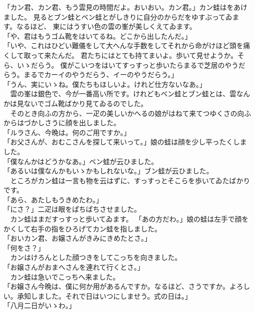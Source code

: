 \documentclass[
a4paper,
book]
{tarticle}
\begin{document}
「カン君、カン君、もう雲見の時間だよ。おいおい。カン君。」カン蛙はをあけました。
見るとブン蛙とベン蛙とがしきりに自分のからだをゆすぶってゐます。なるほど、
東にはうすい色の雲の峯が美しくえてゐます。\\
「や、君はもうゴム靴をはいてるね。どこから出したんだ。」\\
「いや、これはひどい難儀をして大へんな手数をしてそれから命がけほど頭を痛くして取って来たんだ。
君たちにはとても持てまいよ。歩いて見せようか。そら、いゝだらう。
僕がこいつをはいてすっすっと歩いたらまるで芝居のやうだらう。まるでカーイのやうだらう、イーのやうだらう。」\\
「うん、実にいゝね。僕たちもほしいよ。けれど仕方ないなあ。」\\
　雲の峯は銀色で、今が一番高い所です。けれどもベン蛙とブン蛙とは、雲なんかは見ないでゴム靴ばかり見てゐるのでした。\\
　そのとき向ふの方から、一疋の美しいかへるの娘がはねて来てつゆくさの向ふからはづかしさうに顔を出しました。\\
「ルラさん、今晩は。何のご用ですか。」\\
「お父さんが、おむこさんを探して来いって。」娘の蛙は顔を少し平ったくしました。\\
「僕なんかはどうかなあ。」ベン蛙が云ひました。\\
「あるいは僕なんかもいゝかもしれないな。」ブン蛙が云ひました。\\
　ところがカン蛙は一言も物を云はずに、すっすっとそこらを歩いてゐたばかりです。\\
「あら、あたしもうきめたわ。」\\
「にさ？」二疋は眼をぱちぱちさせました。\\
　カン蛙はまだすっすっと歩いてゐます。
「あの方だわ。」娘の蛙は左手で顔をかくして右手の指をひろげてカン蛙を指しました。\\
「おいカン君、お嬢さんがきみにきめたとさ。」\\
「何をさ？」\\
　カンはけろんとした顔つきをしてこっちを向きました。\\
「お嬢さんがおまへさんを連れて行くとさ。」\\
　カン蛙は急いでこっちへ来ました。\\
「お嬢さん今晩は、僕に何か用があるんですか。なるほど、さうですか。よろしい。承知しました。それで日はいつにしませう。式の日は。」\\
「八月二日がいゝわ。」\\
\end{document}
